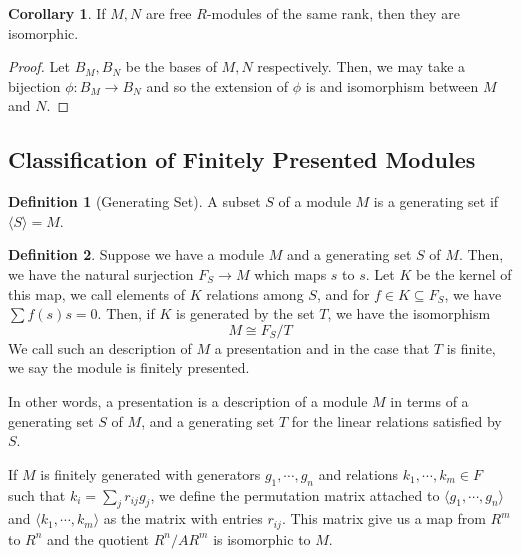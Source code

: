 \documentclass[]{article}
\theoremstyle{definition}
\newtheorem{corollary}{Corollary}[theorem]
\theoremstyle{definition}
\newtheorem{definition}{Definition}[section]
\begin{document}
\begin{corollary}
  If \(M, N\) are free \(R\)-modules of the same rank, then they are isomorphic.
\end{corollary}
\begin{proof}
  Let \(B_M, B_N\) be the bases of \(M, N\) respectively. Then, we may take 
  a bijection \(\phi : B_M \to B_N\) and so the extension of \(\phi\) is 
  and isomorphism between \(M\) and \(N\).
\end{proof}

\subsection{Classification of Finitely Presented Modules}

\begin{definition}[Generating Set]
  A subset \(S\) of a module \(M\) is a generating set if \(\langle S \rangle = M\).
\end{definition}

\begin{definition}
  Suppose we have a module \(M\) and a generating set \(S\) of \(M\). Then, 
  we have the natural surjection \(F_S \to M\) which maps \(s\) to \(s\). 
  Let \(K\) be the kernel of this map, we call elements of \(K\) relations 
  among \(S\), and for \(f \in K \subseteq F_S\), we have \(\sum f(s)s = 0\).  
  Then, if \(K\) is generated by the set \(T\), we have the isomorphism
  \[M \cong F_S / T\]
  We call such an description of \(M\) a presentation and in the case that 
  \(T\) is finite, we say the module is finitely presented.
\end{definition}

In other words, a presentation is a description of a module \(M\) in terms 
of a generating set \(S\) of \(M\), and a generating set \(T\) for the 
linear relations satisfied by \(S\).

If \(M\) is finitely generated with generators \(g_1, \cdots, g_n\) and 
relations \(k_1, \cdots, k_m \in F\) such that \(k_i = \sum_j r_{ij} g_j\), 
we define the permutation matrix attached to \(\langle g_1, \cdots, g_n \rangle\) 
and \(\langle k_1, \cdots, k_m \rangle\) as the matrix with entries \(r_{ij}\).
This matrix give us a map from \(R^m\) to \(R^n\) and the quotient 
\(R^n / AR^m\) is isomorphic to \(M\). 
\end{document}
